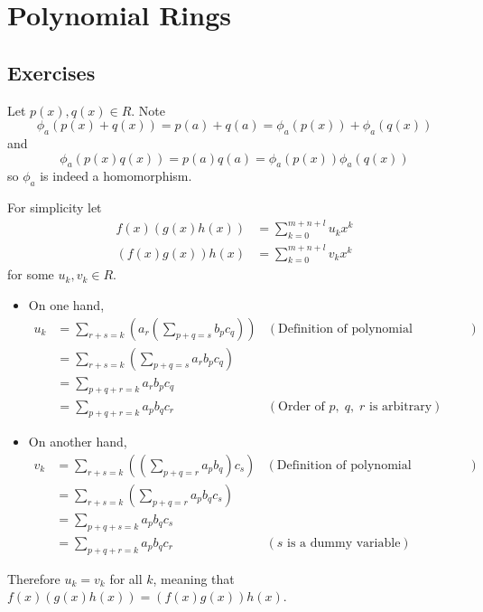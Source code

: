 \section{Polynomial Rings}
\subsection*{Exercises}
\begin{questions}
    \item Let $p(x), q(x) \in R$. Note
    \[
        \phi_a(p(x)+q(x)) = p(a) + q(a) = \phi_a(p(x)) + \phi_a(q(x))
    \]
    and
    \[
        \phi_a(p(x)q(x)) = p(a)q(a) = \phi_a(p(x))\phi_a(q(x))
    \]
    so $\phi_a$ is indeed a homomorphism.

    \item For simplicity let
    \begin{align*}
        f(x)(g(x)h(x)) &= \sum_{k=0}^{m+n+l}u_kx^k\\
        (f(x)g(x))h(x) &= \sum_{k=0}^{m+n+l}v_kx^k
    \end{align*}
    for some $u_k, v_k \in R$.
    \begin{itemize}
        \item On one hand,
        \begin{align*}
            u_k &= \sum_{r+s=k}\left(a_r\left(\sum_{p+q=s}b_pc_q\right)\right) & (\text{Definition of polynomial multiplication})\\
            &= \sum_{r+s=k}\left(\sum_{p+q=s}a_rb_pc_q\right)\\
            &= \sum_{p+q+r=k}a_rb_pc_q\\
            &= \sum_{p+q+r=k}a_pb_qc_r & (\text{Order of }p,\;q,\;r \text{ is arbitrary})
        \end{align*}

        \item On another hand,
        \begin{align*}
            v_k &= \sum_{r+s=k}\left(\left(\sum_{p+q=r}a_pb_q\right)c_s\right) & (\text{Definition of polynomial multiplication})\\
            &= \sum_{r+s=k}\left(\sum_{p+q=r}a_pb_qc_s\right)\\
            &= \sum_{p+q+s=k}a_pb_qc_s\\
            &= \sum_{p+q+r=k}a_pb_qc_r & (s\text{ is a dummy variable})
        \end{align*}
    \end{itemize}
    Therefore $u_k = v_k$ for all $k$, meaning that $f(x)(g(x)h(x)) = (f(x)g(x))h(x)$.


\end{questions}
